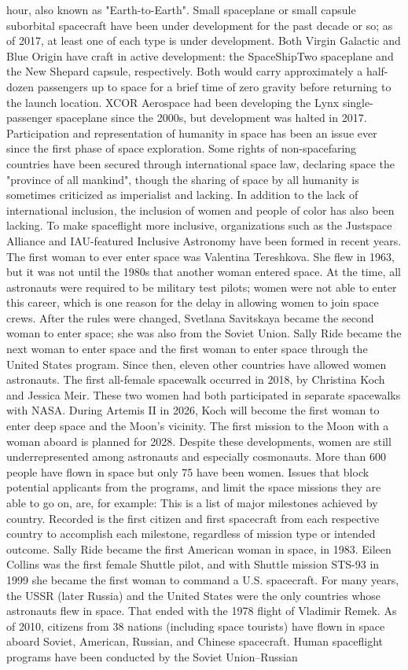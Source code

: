 \documentclass[12pt]{article}
\begin{document}
hour, also known as "Earth-to-Earth". Small spaceplane or small capsule suborbital spacecraft have been under development for the past decade or so; as of 2017, at least one of each type is under development. Both Virgin Galactic and Blue Origin have craft in active development: the SpaceShipTwo spaceplane and the New Shepard capsule, respectively. Both would carry approximately a half-dozen passengers up to space for a brief time of zero gravity before returning to the launch location. XCOR Aerospace had been developing the Lynx single-passenger spaceplane since the 2000s, but development was halted in 2017. Participation and representation of humanity in space has been an issue ever since the first phase of space exploration. Some rights of non-spacefaring countries have been secured through international space law, declaring space the "province of all mankind", though the sharing of space by all humanity is sometimes criticized as imperialist and lacking. In addition to the lack of international inclusion, the inclusion of women and people of color has also been lacking. To make spaceflight more inclusive, organizations such as the Justspace Alliance and IAU-featured Inclusive Astronomy have been formed in recent years. The first woman to ever enter space was Valentina Tereshkova. She flew in 1963, but it was not until the 1980s that another woman entered space. At the time, all astronauts were required to be military test pilots; women were not able to enter this career, which is one reason for the delay in allowing women to join space crews. After the rules were changed, Svetlana Savitskaya became the second woman to enter space; she was also from the Soviet Union. Sally Ride became the next woman to enter space and the first woman to enter space through the United States program. Since then, eleven other countries have allowed women astronauts. The first all-female spacewalk occurred in 2018, by Christina Koch and Jessica Meir. These two women had both participated in separate spacewalks with NASA. During Artemis II in 2026, Koch will become the first woman to enter deep space and the Moon's vicinity. The first mission to the Moon with a woman aboard is planned for 2028. Despite these developments, women are still underrepresented among astronauts and especially cosmonauts. More than 600 people have flown in space but only 75 have been women. Issues that block potential applicants from the programs, and limit the space missions they are able to go on, are, for example: This is a list of major milestones achieved by country. Recorded is the first citizen and first spacecraft from each respective country to accomplish each milestone, regardless of mission type or intended outcome. Sally Ride became the first American woman in space, in 1983. Eileen Collins was the first female Shuttle pilot, and with Shuttle mission STS-93 in 1999 she became the first woman to command a U.S. spacecraft. For many years, the USSR (later Russia) and the United States were the only countries whose astronauts flew in space. That ended with the 1978 flight of Vladimir Remek. As of 2010, citizens from 38 nations (including space tourists) have flown in space aboard Soviet, American, Russian, and Chinese spacecraft. Human spaceflight programs have been conducted by the Soviet Union–Russian 
\end{document}
